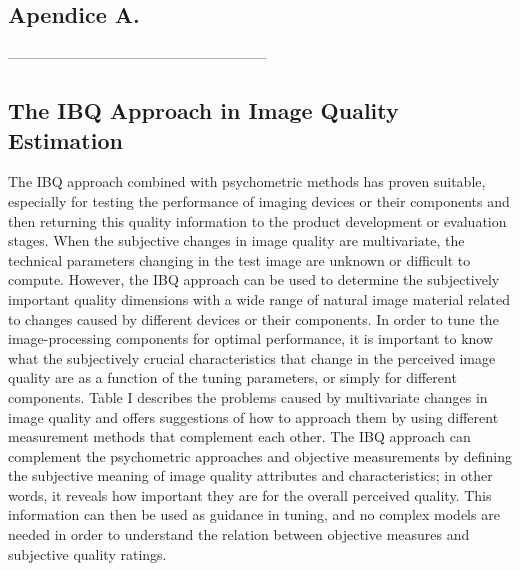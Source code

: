 \documentclass[prodmode,acmtap]{acmlarge}
\begin{document}
\subsection{Apendice A.}



--------------------------------------------------------

\subsection{The IBQ Approach in Image Quality Estimation}

The IBQ approach combined with psychometric methods has proven suitable,
especially for testing the performance of imaging devices or their
components and then returning this quality information to the product
development or evaluation stages. When the subjective changes in image
quality are multivariate, the technical parameters changing in the test
image are unknown or difficult to compute. However, the IBQ approach can be
used to determine the subjectively important quality dimensions with a wide
range of natural image material related to changes caused by different
devices or their components. In order to tune the image-processing
components for optimal performance, it is important to know what the
subjectively crucial characteristics that change in the perceived image
quality are as a function of the tuning parameters, or simply for different
components. Table I describes the problems caused by multivariate changes in
image quality and offers suggestions of how to approach them by using
different measurement methods that complement each other. The IBQ approach
can complement the psychometric approaches and objective measurements by
defining the subjective meaning of image quality attributes and
characteristics; in other words, it reveals how important they are for the
overall perceived quality. This information can then be used as guidance in
tuning, and no complex models are needed in order to understand the relation
between objective measures and subjective quality ratings.
\end{document}
